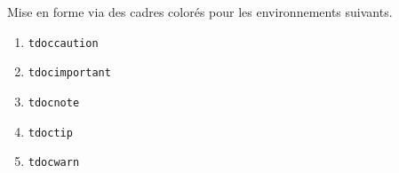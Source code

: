 \documentclass[12pt, a4paper]{article}
\begin{document}
\begin{tdocnew}
    \item Mise en forme via des cadres colorés pour les environnements suivants.
    \bgroup
    \setlength{\multicolsep}{3.0pt plus 1.0pt minus 0.75pt}
    \begin{multicols}{3}
        \begin{enumerate}
        	\item \verb#tdoccaution#
        	\item \verb#tdocimportant#
        	\item \verb#tdocnote#
        	\item \verb#tdoctip#
        	\item \verb#tdocwarn#
        \end{enumerate}
    \end{multicols}
    \egroup
\end{tdocnew}
\end{document}
